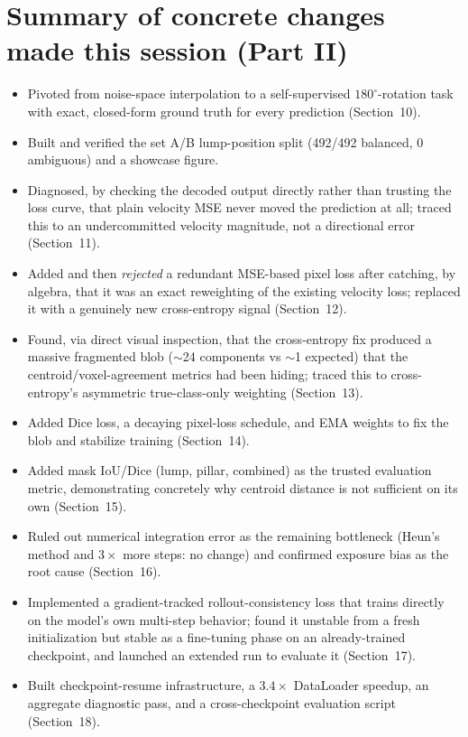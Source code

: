 \documentclass[11pt]{article}
\newcommand{\hsec}[1]{\section*{\color{hdrblue}#1}}
\begin{document}
\hsec{Summary of concrete changes made this session (Part II)}
\begin{itemize}[nosep]
\item Pivoted from noise-space interpolation to a self-supervised $180^\circ$-rotation task
  with exact, closed-form ground truth for every prediction (Section~10).
\item Built and verified the set A/B lump-position split (492/492 balanced, 0 ambiguous) and a
  showcase figure.
\item Diagnosed, by checking the decoded output directly rather than trusting the loss curve,
  that plain velocity MSE never moved the prediction at all; traced this to an undercommitted
  velocity magnitude, not a directional error (Section~11).
\item Added and then \emph{rejected} a redundant MSE-based pixel loss after catching, by
  algebra, that it was an exact reweighting of the existing velocity loss; replaced it with a
  genuinely new cross-entropy signal (Section~12).
\item Found, via direct visual inspection, that the cross-entropy fix produced a massive
  fragmented blob ($\sim$24 components vs $\sim$1 expected) that the centroid/voxel-agreement
  metrics had been hiding; traced this to cross-entropy's asymmetric true-class-only weighting
  (Section~13).
\item Added Dice loss, a decaying pixel-loss schedule, and EMA weights to fix the blob and
  stabilize training (Section~14).
\item Added mask IoU/Dice (lump, pillar, combined) as the trusted evaluation metric,
  demonstrating concretely why centroid distance is not sufficient on its own (Section~15).
\item Ruled out numerical integration error as the remaining bottleneck (Heun's method and
  $3\times$ more steps: no change) and confirmed exposure bias as the root cause (Section~16).
\item Implemented a gradient-tracked rollout-consistency loss that trains directly on the
  model's own multi-step behavior; found it unstable from a fresh initialization but stable as
  a fine-tuning phase on an already-trained checkpoint, and launched an extended run to
  evaluate it (Section~17).
\item Built checkpoint-resume infrastructure, a $3.4\times$ DataLoader speedup, an aggregate
  diagnostic pass, and a cross-checkpoint evaluation script (Section~18).
\end{itemize}
\end{document}
